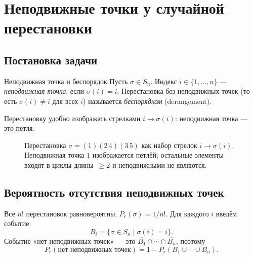 
\section{Неподвижные точки у случайной перестановки}

\subsection{Постановка задачи}

\begin{Definition}{Неподвижная точка и беспорядок}{}
	Пусть $\sigma\in S_n$. Индекс $i\in\{1,\dots,n\}$ — \emph{неподвижная точка}, если $\sigma(i)=i$. Перестановка без неподвижных точек (то есть $\sigma(i)\ne i$ для всех $i$) называется \emph{беспорядком} (derangement).
\end{Definition}

Перестановку удобно изображать стрелками $i\to\sigma(i)$: неподвижная точка — это петля.

\begin{figure}[H]
	\centering
	\caption{Перестановка $\sigma=(1)(2\,4)(3\,5)$ как набор стрелок $i\to\sigma(i)$. Неподвижная точка $1$ изображается петлёй; остальные элементы входят в циклы длины~$\ge 2$ и неподвижными не являются.}
\end{figure}

\subsection{Вероятность отсутствия неподвижных точек}

Все $n!$ перестановок равновероятны, $P_r(\sigma)=1/n!$. Для каждого $i$ введём событие
\[
B_i=\{\sigma\in S_n \mid \sigma(i)=i\}.
\]
Событие «нет неподвижных точек» — это $\overline{B_1}\cap\cdots\cap\overline{B_n}$, поэтому
\[
P_r(\text{нет неподвижных точек})=1-P_r(B_1\cup\cdots\cup B_n).
\]

